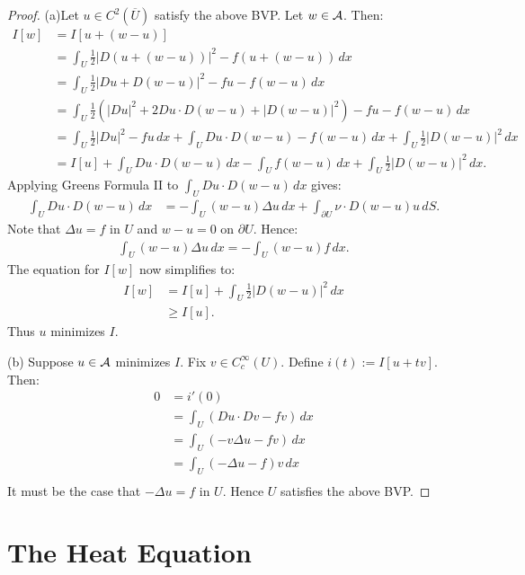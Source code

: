 	\begin{proof}
		(a)Let $u \in C^2(\overline{U})$ satisfy the above BVP. Let $w \in \mathcal{A}$. Then:
		\begin{align*}
			I[w]
			&= I[u+(w-u)] \\
			&= \int_U \frac12 |D(u+(w-u))|^2 - f(u+(w-u))\,dx \\
			&= \int_U \frac12 |Du+D(w-u)|^2 - fu - f(w-u)\,dx \\
			&= \int_U \frac12\left(|Du|^2 + 2Du\cdot D(w-u) + |D(w-u)|^2\right)- fu - f(w-u)\,dx \\
			&= \int_U \frac12 |Du|^2 - fu\,dx+ \int_U Du\cdot D(w-u) - f(w-u)\,dx+ \int_U \frac{1}{2}|D(w-u)|^2\,dx \\
			&= I[u]+ \int_U Du\cdot D(w-u)\,dx - \int_{U}^{} f(w-u)\,dx+ \int_U \frac{1}{2}|D(w-u)|^2\,dx.
		\end{align*}
		Applying Greens Formula II to $\int_{U}^{} Du \cdot D(w-u)\,dx$ gives:
		\begin{align*}
			\int_{U}^{} Du \cdot D(w-u)\,dx
			&= -\int_{U}^{} (w-u) \Delta u\,dx + \int_{\partial U}^{} \nu \cdot D(w-u) u \,dS.
		\end{align*}
		Note that $\Delta u =f$ in $U$ and $w-u = 0$ on $\partial U$. Hence:
		\begin{align*}
			\int_{U}^{} (w-u)\Delta u \,dx = -\int_{U}^{} (w-u)f\,dx.
		\end{align*}
		The equation for $I[w]$ now simplifies to:
		\begin{align*}
			I[w]
			&= I[u] + \int_{U}^{} \frac{1}{2}|D(w-u)|^2\,dx \\
			& \geq I[u].
		\end{align*}
		Thus $u$ minimizes $I$.

		(b) Suppose $u \in \mathcal{A}$ minimizes $I$. Fix $v \in C_c^\infty(U)$. Define $i(t):= I[u+tv]$. Then:
		\begin{align*}
			0
			&= i'(0) \\
			&= \int_{U}^{} (Du \cdot Dv - fv)\,dx \\
			&= \int_{U}^{}(-v\Delta u -fv)\,dx \\
			&= \int_{U}^{} (-\Delta u - f)v\,dx \\
		\end{align*}
		It must be the case that $-\Delta u = f$ in $U$. Hence $U$ satisfies the above BVP.
	\end{proof}

\section{The Heat Equation}

